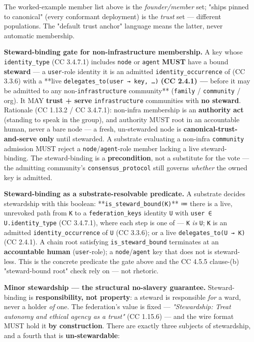 \documentclass[11pt]{article}
\begin{document}
The worked-example member list above is the \textit{founder/member} set; "ships pinned to canonical" (every conformant deployment) is the \textit{trust} set — different populations. The "default trust anchor" language means the latter, never automatic membership.


\textbf{Steward-binding gate for non-infrastructure membership.} A key whose \texttt{identity\_type} (CC 3.4.7.1) includes \texttt{node} or \texttt{agent} \textbf{MUST} have a bound \textbf{steward} — a \texttt{user}-role identity it is an admitted \texttt{identity\_occurrence} of (CC 3.3.6) with a **live \texttt{delegates\_to(user → key, …)}\textbf{ (CC 2.4.1) — }before it may be admitted to any non-\texttt{infrastructure} community** (\texttt{family} / \texttt{community} / org). It MAY \textbf{trust + serve} \texttt{infrastructure} communities with \textbf{no steward}. Rationale (CC 1.13.2 / CC 3.4.7.1): non-infra membership is an \textbf{authority act} (standing to speak in the group), and authority MUST root in an accountable human, never a bare node — a fresh, un-stewarded node is \textbf{canonical-trust-and-serve only} until stewarded. A substrate evaluating a non-infra \texttt{community} admission MUST reject a \texttt{node}/\texttt{agent}-role member lacking a live steward-binding. The steward-binding is a \textbf{precondition}, not a substitute for the vote — the admitting community's \texttt{consensus\_protocol} still governs \textit{whether} the owned key is admitted.


\textbf{Steward-binding as a substrate-resolvable predicate.} A substrate decides stewardship with this boolean: **\texttt{is\_steward\_bound(K)}** ≔ there is a live, unrevoked path from \texttt{K} to a \texttt{federation\_keys} identity \texttt{U} with \texttt{user ∈ U.identity\_type} (CC 3.4.7.1), where each step is one of — \texttt{K} \textit{is} \texttt{U}; \texttt{K} is an admitted \texttt{identity\_occurrence} of \texttt{U} (CC 3.3.6); or a live \texttt{delegates\_to(U → K)} (CC 2.4.1). A chain root satisfying \texttt{is\_steward\_bound} terminates at an \textbf{accountable human} (\texttt{user}-role); a \texttt{node}/\texttt{agent} key that does not is steward-less. This is the concrete predicate the gate above and the CC 4.5.5 clause-(b) "steward-bound root" check rely on — not rhetoric.


\textbf{Minor stewardship — the structural no-slavery guarantee.} Steward-binding is \textbf{responsibility, not property}: a steward is responsible \textit{for} a ward, never a holder \textit{of} one. The federation's value is fixed — \textit{"Stewardship: Treat autonomy and ethical agency as a trust"} (CC 1.15.6) — and the wire format MUST hold it \textbf{by construction}. There are exactly three subjects of stewardship, and a fourth that is \textbf{un-stewardable}:
\end{document}

